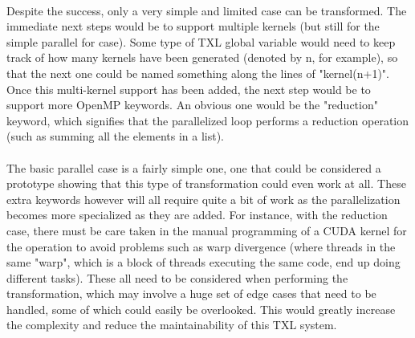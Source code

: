 \documentclass{article}
\begin{document}
\paragraph{}
Despite the success, only a very simple and limited case can be transformed. The immediate next steps would be to support multiple kernels (but still for the simple parallel for case). Some type of TXL global variable would need to keep track of how many kernels have been generated (denoted by n, for example), so that the next one could be named something along the lines of "kernel(n+1)". Once this multi-kernel support has been added, the next step would be to support more OpenMP keywords. An obvious one would be the "reduction" keyword, which signifies that the parallelized loop performs a reduction operation (such as summing all the elements in a list).

\paragraph{}
The basic parallel case is a fairly simple one, one that could be considered a prototype showing that this type of transformation could even work at all. These extra keywords however will all require quite a bit of work as the parallelization becomes more specialized as they are added. For instance, with the reduction case, there must be care taken in the manual programming of a CUDA kernel for the operation to avoid problems such as warp divergence (where threads in the same "warp", which is a block of threads executing the same code, end up doing different tasks). These all need to be considered when performing the transformation, which may involve a huge set of edge cases that need to be handled, some of which could easily be overlooked. This would greatly increase the complexity and reduce the maintainability of this TXL system.

\medskip
 
\printbibliography %
\end{document}

